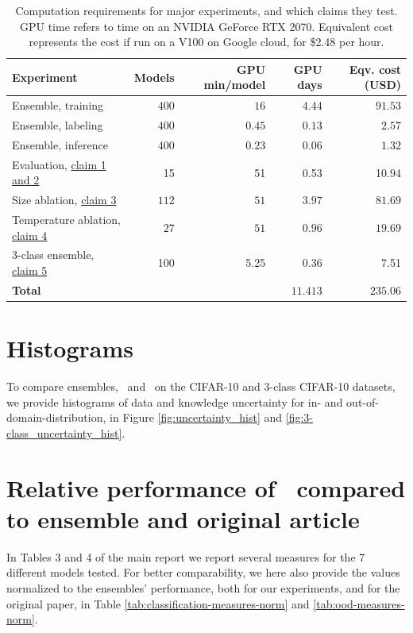 \begin{table}[]
    \centering
     \caption{Computation requirements for major experiments, and which claims they test. GPU time refers to time on an NVIDIA GeForce RTX 2070. Equivalent cost represents the cost if run on a V100 on Google cloud, for \$2.48 per hour. }
    \begin{tabular}{l || r | r | r| r}
         \textbf{Experiment} & \textbf{Models} & \textbf{GPU min/model}  & \textbf{GPU days} & \textbf{Eqv. cost (USD)}  \\
         \hline
         \hline
         Ensemble, training & $400$ & $16$ & $4.44$ & $91.53$\\
         Ensemble, labeling & $400$& $0.45$ & $0.13$ & $2.57$\\
         Ensemble, inference & $400$& $0.23$ & $0.06$ & $1.32$ \\
         \hline 
         Evaluation, \hyperlink{claim1}{claim 1 and 2} & 15 & 51 & 0.53 & 10.94 \\
         \hline
         Size ablation, \hyperlink{claim3}{claim 3} & $112$ & $51$ & $3.97$ & $81.69$ \\
         Temperature ablation, \hyperlink{claim4}{claim 4} & $27$ & $51$ & $0.96$& $19.69$\\
         \hline
         3-class ensemble, \hyperlink{claim 5}{claim 5} &100 &5.25 &0.36 &7.51 \\
         \hline
         \hline
         \textbf{Total} & & & $11.413$ & $235.06$
    \end{tabular}
   
    \label{tab:comp}
\end{table}


\section{Histograms}
To compare ensembles, \EnDD \ and \EnDDaux \ on the CIFAR-10 and 3-class CIFAR-10 datasets, we provide histograms of data and knowledge uncertainty for in- and out-of-domain-distribution, in Figure \ref{fig:uncertainty_hist} and \ref{fig:3-class_uncertainty_hist}. 


\section{Relative performance of \EnDD \ compared to ensemble and original article}

In Tables 3 and 4 of the main report we report several measures for the 7 different models tested. For better comparability, we here also provide the values normalized to the ensembles' performance, both for our experiments, and for the original paper, in Table \ref{tab:classification-measures-norm} and \ref{tab:ood-measures-norm}. 




